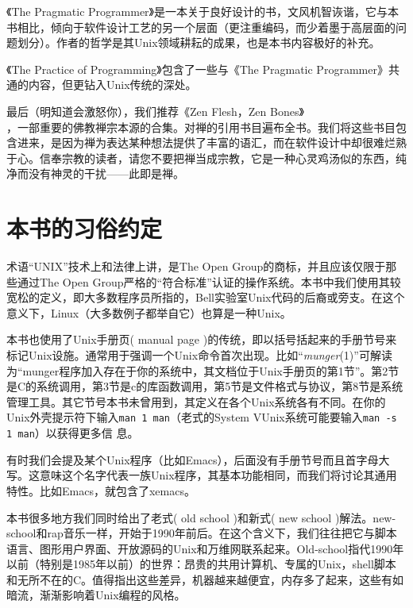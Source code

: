 \documentclass[12pt,oneside]{book}
\begin{document}
\begin{common-format}
《The Pragmatic Programmer》\cite{Hunt-Thomas}是一本关于良好设计的书，文风机智诙谐，它与本书相比，倾向于软件设计工艺的另一个层面（更注重编码，而少着墨于高层面的问题划分）。作者的哲学是其Unix领域耕耘的成果，也是本书内容极好的补充。

《The Practice of Programming》\cite{Kernighan-Pike99}包含了一些与《The Pragmatic Programmer》共通的内容，但更钻入Unix传统的深处。

最后（明知道会激怒你），我们推荐《Zen Flesh，Zen Bones》\\ \cite{Reps-Senzaki}，一部重要的佛教禅宗本源的合集。对禅的引用书目遍布全书。我们将这些书目包含进来，是因为禅为表达某种想法提供了丰富的语汇，而在软件设计中却很难烂熟于心。信奉宗教的读者，请您不要把禅当成宗教，它是一种心灵鸡汤似的东西，纯净而没有神灵的干扰——此即是禅。

\section{本书的习俗约定}
术语“UNIX”技术上和法律上讲，是The Open Group的商标，并且应该仅限于那些通过The Open Group严格的“符合标准”认证的操作系统。本书中我们使用其较宽松的定义，即大多数程序员所指的，Bell实验室Unix代码的后裔或旁支。在这个意义下，Linux（大多数例子都举自它）也算是一种Unix。

本书也使用了Unix手册页( manual page )的传统，即以括号括起来的手册节号来标记Unix设施。通常用于强调一个Unix命令首次出现。比如“\textit{munger}(1)”可解读为“munger程序加入存在于你的系统中，其文档位于Unix手册页的第1节”。第2节是C的系统调用，第3节是c的库函数调用，第5节是文件格式与协议，第8节是系统管理工具。其它节号本书未曾用到，其定义在各个Unix系统各有不同。在你的Unix外壳提示符下输入\verb+man 1 man+（老式的System VUnix系统可能要输入\verb+man -s 1 man+）以获得更多信
息。

有时我们会提及某个Unix程序（比如Emacs），后面没有手册节号而且首字母大写。这意味这个名字代表一族Unix程序，其基本功能相同，而我们将讨论其通用特性。比如Emacs，就包含了xemacs。

本书很多地方我们同时给出了老式( old school )和新式( new school )解法。new-school和rap音乐一样，开始于1990年前后。在这个含义下，我们往往把它与脚本语言、图形用户界面、开放源码的Unix和万维网联系起来。Old-school指代1990年以前（特别是1985年以前）的世界：昂贵的共用计算机、专属的Unix，shell脚本和无所不在的C。值得指出这些差异，机器越来越便宜，内存多了起来，这些有如暗流，渐渐影响着Unix编程的风格。


\end{common-format}
\end{document}
